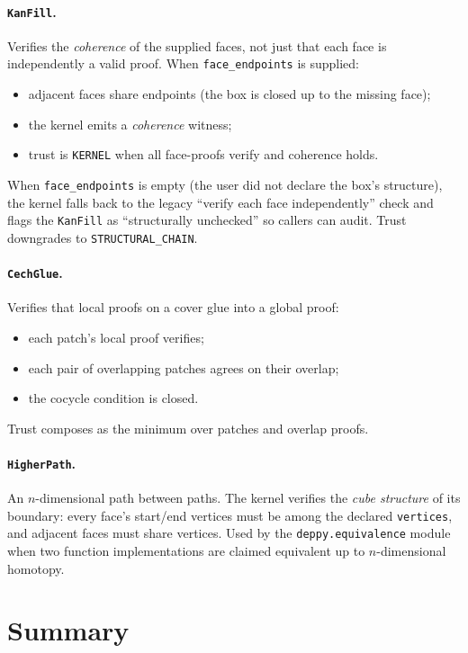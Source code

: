 \paragraph{\texttt{KanFill}.}  Verifies the \emph{coherence} of the
supplied faces, not just that each face is independently a valid
proof.  When \texttt{face\_endpoints} is supplied:
\begin{itemize}[leftmargin=1.7em]
  \item adjacent faces share endpoints (the box is closed up to the
    missing face);
  \item the kernel emits a \emph{coherence} witness;
  \item trust is \texttt{KERNEL} when all face-proofs verify and
    coherence holds.
\end{itemize}

When \texttt{face\_endpoints} is empty (the user did not declare
the box's structure), the kernel falls back to the legacy
``verify each face independently'' check and flags the
\texttt{KanFill} as ``structurally unchecked'' so callers can
audit.  Trust downgrades to \texttt{STRUCTURAL\_CHAIN}.

\paragraph{\texttt{CechGlue}.}  Verifies that local proofs on a
cover glue into a global proof:
\begin{itemize}[leftmargin=1.7em]
  \item each patch's local proof verifies;
  \item each pair of overlapping patches agrees on their overlap;
  \item the cocycle condition is closed.
\end{itemize}
Trust composes as the minimum over patches and overlap proofs.

\paragraph{\texttt{HigherPath}.}  An $n$-dimensional path between
paths.  The kernel verifies the \emph{cube structure} of its
boundary: every face's start/end vertices must be among the
declared \texttt{vertices}, and adjacent faces must share
vertices.  Used by the \texttt{deppy.equivalence} module when two
function implementations are claimed equivalent up to
$n$-dimensional homotopy.

\section{Summary}

